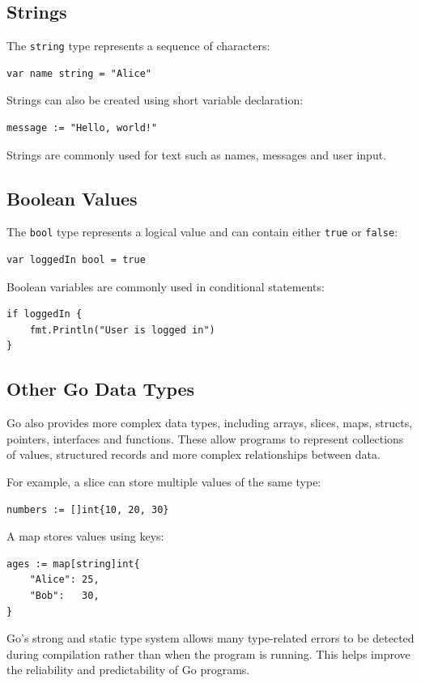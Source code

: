 \subsection{Strings}

The \texttt{string} type represents a sequence of characters:

\begin{lstlisting}
var name string = "Alice"
\end{lstlisting}

Strings can also be created using short variable declaration:

\begin{lstlisting}
message := "Hello, world!"
\end{lstlisting}

Strings are commonly used for text such as names, messages and user input.


\subsection{Boolean Values}

The \texttt{bool} type represents a logical value and can contain either
\texttt{true} or \texttt{false}:

\begin{lstlisting}
var loggedIn bool = true
\end{lstlisting}

Boolean variables are commonly used in conditional statements:

\begin{lstlisting}
if loggedIn {
    fmt.Println("User is logged in")
}
\end{lstlisting}


\subsection{Other Go Data Types}

Go also provides more complex data types, including arrays, slices, maps,
structs, pointers, interfaces and functions. These allow programs to
represent collections of values, structured records and more complex
relationships between data.

For example, a slice can store multiple values of the same type:

\begin{lstlisting}
numbers := []int{10, 20, 30}
\end{lstlisting}

A map stores values using keys:

\begin{lstlisting}
ages := map[string]int{
    "Alice": 25,
    "Bob":   30,
}
\end{lstlisting}

Go's strong and static type system allows many type-related errors to be
detected during compilation rather than when the program is running. This
helps improve the reliability and predictability of Go programs.